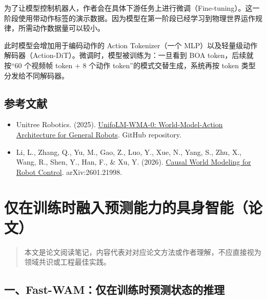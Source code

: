 为了让模型控制机器人，作者会在具体下游任务上进行微调（Fine-tuning）。这一阶段使用带动作标签的演示数据。因为模型在第一阶段已经学习到物理世界运作规律，所需动作数据量可以较小。

此时模型会增加用于编码动作的 Action Tokenizer（一个 MLP）以及轻量级动作解码器（Action-DiT）。微调时，模型被训练为：一旦看到 BOA token，后续就按``60 个视频帧 token + 8 个动作 token''的模式交替生成，系统再按 token 类型分发给不同解码器。

\hypertarget{ux53c2ux8003ux6587ux732e-206}{%
\subsection{参考文献}\label{ux53c2ux8003ux6587ux732e-206}}

\begin{itemize}
\tightlist
\item
  Unitree Robotics. (2025). \href{https://github.com/unitreerobotics/unifolm-world-model-action}{UnifoLM-WMA-0: World-Model-Action Architecture for General Robots}. GitHub repository.
\item
  Li, L., Zhang, Q., Yu, M., Gao, Z., Luo, Y., Xue, N., Yang, S., Zhu, X., Wang, R., Shen, Y., Han, F., \& Xu, Y. (2026). \href{https://arxiv.org/abs/2601.21998}{Causal World Modeling for Robot Control}. arXiv:2601.21998.
\end{itemize}

\clearpage

\hypertarget{ux4ec5ux5728ux8badux7ec3ux65f6ux878dux5165ux9884ux6d4bux80fdux529bux7684ux5177ux8eabux667aux80fdux8bbaux6587}{%
\section{仅在训练时融入预测能力的具身智能（论文）}\label{ux4ec5ux5728ux8badux7ec3ux65f6ux878dux5165ux9884ux6d4bux80fdux529bux7684ux5177ux8eabux667aux80fdux8bbaux6587}}

\begin{quote}
本文是论文阅读笔记，内容代表对对应论文方法或作者理解，不应直接视为领域共识或工程最佳实践。
\end{quote}

\hypertarget{ux4e00fast-wamux4ec5ux5728ux8badux7ec3ux65f6ux9884ux6d4bux72b6ux6001ux7684ux63a8ux7406}{%
\subsection{一、Fast-WAM：仅在训练时预测状态的推理}\label{ux4e00fast-wamux4ec5ux5728ux8badux7ec3ux65f6ux9884ux6d4bux72b6ux6001ux7684ux63a8ux7406}}

